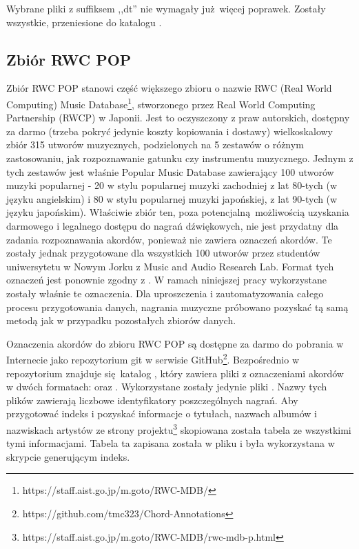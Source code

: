 Wybrane pliki z suffiksem ,,dt'' nie wymagały już więcej poprawek. Zostały wszystkie, przeniesione
do katalogu .

\subsection{Zbiór RWC POP}

Zbiór RWC POP \cite{goto_rwc_nodate} stanowi część większego zbioru o nazwie RWC (Real World
Computing) Music Database\footnote{https://staff.aist.go.jp/m.goto/RWC-MDB/}, stworzonego przez Real
World Computing Partnership (RWCP) w Japonii. Jest to oczyszczony z praw autorskich, dostępny za
darmo (trzeba pokryć jedynie koszty kopiowania i dostawy) wielkoskalowy zbiór 315 utworów
muzycznych, podzielonych na 5 zestawów o różnym zastosowaniu, jak rozpoznawanie gatunku czy
instrumentu muzycznego. Jednym z tych zestawów jest właśnie Popular Music Database zawierający 100
utworów muzyki popularnej - 20 w stylu popularnej muzyki zachodniej z lat 80-tych (w języku
angielskim) i 80 w stylu popularnej muzyki japońskiej, z lat 90-tych (w języku japońskim). Właściwie
zbiór ten, poza potencjalną możliwością uzyskania darmowego i legalnego dostępu do nagrań
dźwiękowych, nie jest przydatny dla zadania rozpoznawania akordów, ponieważ nie zawiera oznaczeń
akordów. Te zostały jednak przygotowane dla wszystkich 100 utworów przez studentów uniwersytetu w
Nowym Jorku z Music and Audio Research Lab. Format tych oznaczeń jest ponownie zgodny z
\cite{harte_towards_nodate}. W ramach niniejszej pracy wykorzystane zostały właśnie te oznaczenia.
Dla uproszczenia i zautomatyzowania całego procesu przygotowania danych, nagrania muzyczne próbowano
pozyskać tą samą metodą jak w przypadku pozostałych zbiorów danych.

Oznaczenia akordów do zbioru RWC POP są dostępne za darmo do pobrania w Internecie jako repozytorium
git w serwisie GitHub\footnote{https://github.com/tmc323/Chord-Annotations}. Bezpośrednio w
repozytorium znajduje się katalog , który zawiera pliki z oznaczeniami akordów w
dwóch formatach:  oraz . Wykorzystane zostały jedynie pliki . Nazwy
tych plików zawierają liczbowe identyfikatory poszczególnych nagrań. Aby przygotować indeks i
pozyskać informacje o tytułach, nazwach albumów i nazwiskach artystów ze strony
projektu\footnote{https://staff.aist.go.jp/m.goto/RWC-MDB/rwc-mdb-p.html} skopiowana została tabela
ze wszystkimi tymi informacjami. Tabela ta zapisana została w pliku
 i była wykorzystana w skrypcie generującym indeks.

